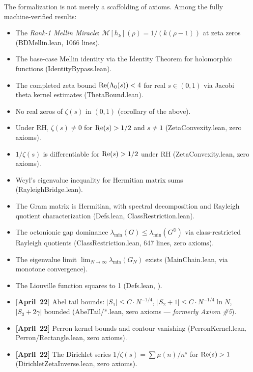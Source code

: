 \documentclass[11pt,a4paper]{article}
\begin{document}
The formalization is not merely a scaffolding of axioms. Among the fully
machine-verified results:

\begin{itemize}
  \item The \emph{Rank-1 Mellin Miracle}: $\mathcal{M}[h_k](\rho) =
    1/(k(\rho-1))$ at zeta zeros (BDMellin.lean, 1066 lines).
  \item The base-case Mellin identity via the Identity Theorem for
    holomorphic functions (IdentityBypass.lean).
  \item The completed zeta bound $\operatorname{Re}(\Lambda_0(s)) < 4$ for real
    $s \in (0,1)$ via Jacobi theta kernel estimates (ThetaBound.lean).
  \item No real zeros of $\zeta(s)$ in $(0,1)$ (corollary of the above).
  \item Under RH, $\zeta(s) \neq 0$ for $\operatorname{Re}(s) > 1/2$ and $s \neq 1$
    (ZetaConvexity.lean, zero axioms).
  \item $1/\zeta(s)$ is differentiable for $\operatorname{Re}(s) > 1/2$ under RH
    (ZetaConvexity.lean, zero axioms).
  \item Weyl's eigenvalue inequality for Hermitian matrix sums
    (RayleighBridge.lean).
  \item The Gram matrix is Hermitian, with spectral decomposition and
    Rayleigh quotient characterization (Defs.lean, ClassRestriction.lean).
  \item The octonionic gap dominance $\lambda_{\min}(G) \le
    \lambda_{\min}(G^{\mathbb{O}})$ via class-restricted Rayleigh
    quotients (ClassRestriction.lean, 647 lines, zero axioms).
  \item The eigenvalue limit $\lim_{N \to \infty} \lambda_{\min}(G_N)$
    exists (MainChain.lean, via monotone convergence).
  \item The Liouville function squares to 1 (Defs.lean, ).
  \item \textbf{[April~22]} Abel tail bounds: $|S_1| \le C \cdot N^{-1/4}$,
    $|S_2+1| \le C \cdot N^{-1/4} \ln N$, $|S_3+2\gamma|$ bounded
    (AbelTail/*.lean, zero axioms --- \emph{formerly Axiom \#5}).
  \item \textbf{[April~22]} Perron kernel bounds and contour vanishing
    (PerronKernel.lean, Perron/Rectangle.lean, zero axioms).
  \item \textbf{[April~22]} The Dirichlet series $1/\zeta(s) =
    \sum \mu(n)/n^s$ for $\operatorname{Re}(s) > 1$ (DirichletZetaInverse.lean, zero axioms).
\end{itemize}
\end{document}
